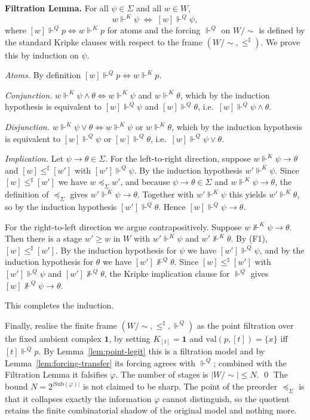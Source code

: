 \documentclass[final,12pt]{elsarticle}
\theoremstyle{plain}
\theoremstyle{definition}
\begin{document}
\textbf{Filtration Lemma.} For all \(\psi \in \Sigma\) and all \(w \in W\),
\[
  w \Vdash^{K} \psi \;\iff\; [w] \Vdash^{Q} \psi,
\]
where \([w] \Vdash^{Q} p \iff w \Vdash^{K} p\) for atoms and the forcing
\(\Vdash^{Q}\) on \(W/{\sim}\) is defined by the standard Kripke clauses with
respect to the frame \((W/{\sim}, \le^{\sharp})\).  We prove this by induction on
\(\psi\).

\emph{Atoms.}  By definition \([w] \Vdash^{Q} p \iff w \Vdash^{K} p\).

\emph{Conjunction.}  \(w \Vdash^{K} \psi \wedge \theta \iff w \Vdash^{K} \psi\)
and \(w \Vdash^{K} \theta\), which by the induction hypothesis is equivalent to
\([w] \Vdash^{Q} \psi\) and \([w] \Vdash^{Q} \theta\), i.e.\ \([w] \Vdash^{Q}
\psi \wedge \theta\).

\emph{Disjunction.}  \(w \Vdash^{K} \psi \vee \theta \iff w \Vdash^{K} \psi\) or
\(w \Vdash^{K} \theta\), which by the induction hypothesis is equivalent to
\([w] \Vdash^{Q} \psi\) or \([w] \Vdash^{Q} \theta\), i.e.\ \([w] \Vdash^{Q}
\psi \vee \theta\).

\emph{Implication.}  Let \(\psi \to \theta \in \Sigma\).  For the left-to-right
direction, suppose \(w \Vdash^{K} \psi \to \theta\) and \([w] \le^{\sharp}
[w']\) with \([w'] \Vdash^{Q} \psi\).  By the induction hypothesis \(w'
\Vdash^{K} \psi\).  Since \([w] \le^{\sharp} [w']\) we have \(w \preceq_{\Sigma}
w'\), and because \(\psi \to \theta \in \Sigma\) and \(w \Vdash^{K} \psi \to
\theta\), the definition of \(\preceq_{\Sigma}\) gives \(w' \Vdash^{K} \psi \to
\theta\).  Together with \(w' \Vdash^{K} \psi\) this yields \(w' \Vdash^{K}
\theta\), so by the induction hypothesis \([w'] \Vdash^{Q} \theta\).  Hence
\([w] \Vdash^{Q} \psi \to \theta\).

For the right-to-left direction we argue contrapositively.  Suppose
\(w \nVdash^{K} \psi \to \theta\).  Then there is a stage \(w' \ge w\) in
\(W\) with \(w' \Vdash^{K} \psi\) and \(w' \nVdash^{K} \theta\).  By (F1),
\([w] \le^{\sharp} [w']\).  By the induction hypothesis for \(\psi\) we have
\([w'] \Vdash^{Q} \psi\), and by the induction hypothesis for \(\theta\) we
have \([w'] \nVdash^{Q} \theta\).  Since \([w] \le^{\sharp} [w']\) with
\([w'] \Vdash^{Q} \psi\) and \([w'] \nVdash^{Q} \theta\), the Kripke
implication clause for \(\Vdash^{Q}\) gives \([w] \nVdash^{Q} \psi \to \theta\).


This completes the induction.

Finally, realise the finite frame \((W/{\sim}, \le^{\sharp}, \Vdash^{Q})\) as the
point filtration over the fixed ambient complex \(\mathbf 1\), by setting
\(K_{[t]} = \mathbf 1\) and
\(\mathrm{val}(p,[t]) = \{x\}\) iff \([t] \Vdash^{Q} p\). By
Lemma~\ref{lem:point-legit} this is a filtration model and by
Lemma~\ref{lem:forcing-transfer} its forcing agrees with \(\Vdash^{Q}\);
combined with the Filtration Lemma it falsifies \(\varphi\). The number of stages is
\(|W/{\sim}| \le N\).
\qed
The bound \(N=2^{|\mathrm{Sub}(\varphi)|}\) is not claimed to be sharp. The point
of the preorder \(\preceq_{\Sigma}\) is that it collapses exactly the information
\(\varphi\) cannot distinguish, so the quotient retains the finite combinatorial
shadow of the original model and nothing more.
\end{document}
